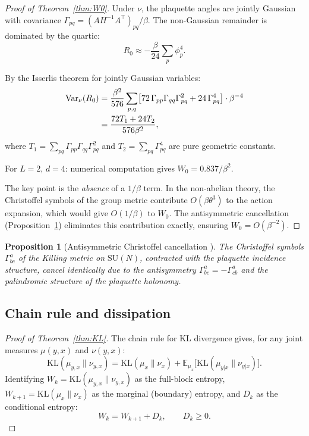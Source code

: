 \documentclass[11pt]{article}
\newtheorem{proposition}[theorem]{Proposition}
\theoremstyle{definition}
\newcommand{\KL}{\mathrm{KL}}
\newcommand{\Var}{\mathrm{Var}}
\newcommand{\E}{\mathbb{E}}
\begin{document}
\begin{proof}[Proof of Theorem~\ref{thm:W0}]
Under $\nu$, the plaquette angles are jointly Gaussian with 
covariance $\Gamma_{pq} = (A H^{-1} A^\top)_{pq}/\beta$.  
The non-Gaussian remainder is dominated by the quartic:
\[
  R_0 \approx -\frac{\beta}{24} \sum_p \phi_p^4.
\]

By the Isserlis theorem for jointly Gaussian variables:
\begin{align}
  \Var_\nu(R_0) &= \frac{\beta^2}{576} \sum_{p,q} 
  \bigl[72\,\Gamma_{pp}\Gamma_{qq}\Gamma_{pq}^2 
  + 24\,\Gamma_{pq}^4\bigr] \cdot \beta^{-4} \notag\\
  &= \frac{72 T_1 + 24 T_2}{576 \beta^2},
\end{align}
where $T_1 = \sum_{pq} \Gamma_{pp}\Gamma_{qq}\Gamma_{pq}^2$ and 
$T_2 = \sum_{pq} \Gamma_{pq}^4$ are pure geometric constants.

For $L = 2$, $d = 4$: numerical computation gives 
$W_0 = 0.837/\beta^2$.

The key point is the \emph{absence} of a $1/\beta$ term.  
In the non-abelian theory, the Christoffel symbols of the group metric 
contribute $O(\beta \theta^3)$ to the action expansion, which would 
give $O(1/\beta)$ to $W_0$.  The antisymmetric cancellation 
(Proposition~\ref{prop:antisym}) eliminates this contribution exactly, 
ensuring $W_0 = O(\beta^{-2})$.
\end{proof}

\begin{proposition}[Antisymmetric Christoffel cancellation 
{\cite{Fontes_antisym}}]\label{prop:antisym}
The Christoffel symbols $\Gamma^a_{bc}$ of the Killing metric on 
$\mathrm{SU}(N)$, contracted with the plaquette incidence structure, 
cancel identically due to the antisymmetry 
$\Gamma^a_{bc} = -\Gamma^a_{cb}$ and the palindromic structure 
of the plaquette holonomy.
\end{proposition}

\subsection{Chain rule and dissipation}

\begin{proof}[Proof of Theorem~\ref{thm:KL}]
The chain rule for KL divergence gives, for any joint measures 
$\mu(y, x)$ and $\nu(y, x)$:
\[
  \KL(\mu_{y,x} \| \nu_{y,x}) = \KL(\mu_x \| \nu_x) 
  + \E_{\mu_x}\bigl[\KL(\mu_{y|x} \| \nu_{y|x})\bigr].
\]
Identifying $W_k = \KL(\mu_{y,x} \| \nu_{y,x})$ as the full-block 
entropy, $W_{k+1} = \KL(\mu_x \| \nu_x)$ as the marginal (boundary) 
entropy, and $D_k$ as the conditional entropy:
\[
  W_k = W_{k+1} + D_k, \qquad D_k \geq 0.
\]
\end{proof}
\end{document}

